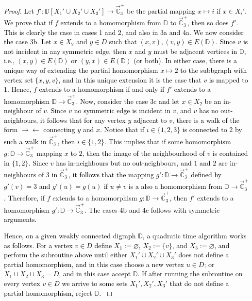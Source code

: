 \documentclass{article}
\theoremstyle{definition}
\theoremstyle{remark}
\newcommand{\blue}[1]{\textcolor{black}{#1}}
\newcommand{\bC}{{\mathbb C}}
\newcommand{\bD}{{\mathbb D}}
\begin{document}
\begin{proof}
\blue{Let $f'\colon\bD[X_1'\cup X_2'\cup X_3']\to \vec{\bC}_3^+$ be the partial mapping $x \mapsto i$
if $x \in X_i'$. We prove that if $f$ extends to a homomorphism from $\bD$ to $\vec{\bC}_3^+$, then
so does $f'$. This is clearly the case in cases 1 and 2, and also in 3a and 4a. We now consider the
case 3b. Let $x\in X_2$ and $y\in D$ such that $(x,v), (v,y)\in E(\bD)$. Since $v$ is not incident
in any symmetric edge, then $x$ and $y$ must be adjacent vertices in $\bD$, i.e.,  $(x,y)\in E(\bD)$
or $(y,x)\in E(\bD)$ (or both). In either case, there is a unique way of extending the
partial homomorphism $x\mapsto 2$ to the subbgraph with vertex set $\{x,y,v\}$, and in this unique
extension it is the case that $v$ is mapped to $1$. Hence, $f$ extends to a homomorphism if and only
if $f'$ extends to a homomorphism $\bD\to \vec{\bC}_3^+$. Now, consider the case 3c and let
$x\in X_2$ be an in-neighbour of $v$. Since $v$ no symmetric edge is incident in $v$, and $v$ has no out-neighbours,
it follows that for any vertex $y$ adjacent to $v$, there is a walk of the form $\rightarrow\leftarrow$
connecting $y$ and $x$. Notice that if $i\in\{1,2,3\}$ is connected to $2$ by such a walk in $\vec{\bC}_3^+$, then
$i\in\{1,2\}$. This implies  that if some homomorphism $g\colon \bD\to \vec{\bC}_3^+$ mapping $x$ to $2$,
then the image of the neighbourhood of $v$ is contained in $\{1,2\}$. Since $v$ has in-neighbours but no
out-neighbours, and $1$ and $2$ are in-neighbours of $3$ in $\vec{\bC}_3^+$, it follows that the mapping
$g'\colon \bD\to \vec{\bC}_3^+$ defined by $g'(v) = 3$ and $g'(u) = g(u)$ if $u\neq v$ is a also a homomorphism
from $\bD\to \vec{\bC}_3^+$. Therefore, if $f$ extends to a homomorphism $g\colon \bD\to \vec{\bC}_3^+$, 
then $f'$ extends to a homomorphism $g'\colon \bD\to \vec{\bC}_3^+$.
The cases 4b and 4c follows with symmetric arguments.}

\blue{
Hence, on a given weakly connected digraph $\bD$,  a quadratic time algorithm works as follows.
For a vertex $v\in D$ define $X_1 := \varnothing$, $X_2:= \{v\}$, and $X_3:=\varnothing$,
and perform the subroutine above until either $X_1'\cup X_2'\cup X_3'$ does not define a
partial homomorphism, and in this case choose a new vertex $u\in D$; or 
$X_1\cup X_2 \cup X_3 = D$, and in this case accept $\bD$. If after running the subroutine
on every vertex $v\in D$ we arrive to some sets $X_1',X_2',X_3'$ that do not define a partial homomorphism,
reject $\bD$.
}
\end{proof}
\end{document}

